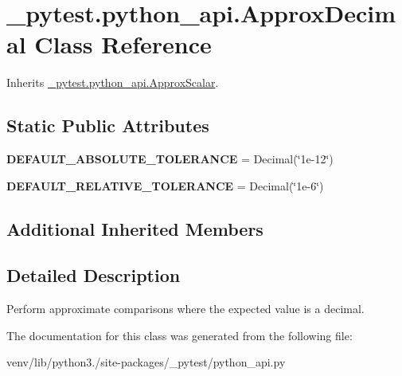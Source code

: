 \hypertarget{class__pytest_1_1python__api_1_1_approx_decimal}{}\section{\+\_\+pytest.\+python\+\_\+api.\+Approx\+Decimal Class Reference}
\label{class__pytest_1_1python__api_1_1_approx_decimal}


Inherits \hyperlink{class__pytest_1_1python__api_1_1_approx_scalar}{\+\_\+pytest.\+python\+\_\+api.\+Approx\+Scalar}.

\subsection*{Static Public Attributes}
\begin{DoxyCompactItemize}
\item 
\mbox{\label{class__pytest_1_1python__api_1_1_approx_decimal_a5fde92ba2335404cf6fc1287c69341cb}} 
{\bfseries D\+E\+F\+A\+U\+L\+T\+\_\+\+A\+B\+S\+O\+L\+U\+T\+E\+\_\+\+T\+O\+L\+E\+R\+A\+N\+CE} = Decimal(\char`\"{}1e-\/12\char`\"{})
\item 
\mbox{\label{class__pytest_1_1python__api_1_1_approx_decimal_a0b225c266922630ebdf75b3756c84758}} 
{\bfseries D\+E\+F\+A\+U\+L\+T\+\_\+\+R\+E\+L\+A\+T\+I\+V\+E\+\_\+\+T\+O\+L\+E\+R\+A\+N\+CE} = Decimal(\char`\"{}1e-\/6\char`\"{})
\end{DoxyCompactItemize}
\subsection*{Additional Inherited Members}


\subsection{Detailed Description}
\begin{DoxyVerb}Perform approximate comparisons where the expected value is a decimal.
\end{DoxyVerb}
 

The documentation for this class was generated from the following file\+:\begin{DoxyCompactItemize}
\item 
venv/lib/python3./site-\/packages/\+\_\+pytest/python\+\_\+api.\+py\end{DoxyCompactItemize}
